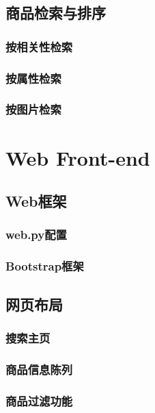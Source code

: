 
\chapter{商品检索与排序}

\section{按相关性检索}

\section{按属性检索}

\section{按图片检索}


\part{Web Front-end}

\chapter{Web框架}

\section{web.py配置}

\section{Bootstrap框架}


\chapter{网页布局}

\section{搜索主页}

\section{商品信息陈列}

\section{商品过滤功能}
